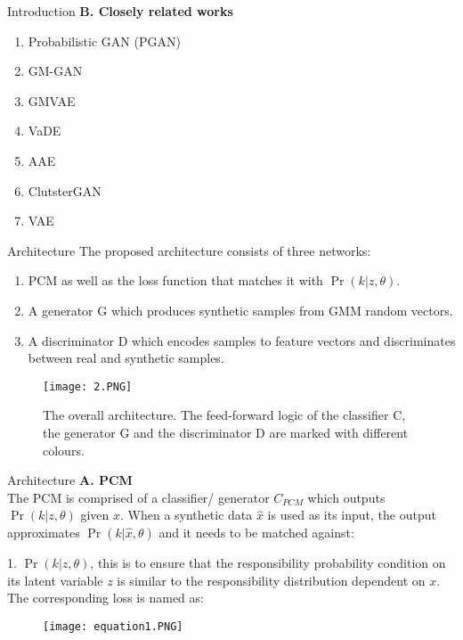 \documentclass{beamer}
\providecommand{\pr}[1]{\ensuremath{\Pr\left(#1\right)}}
\begin{document}
\begin{frame}{Introduction}
\textbf{B. Closely related works}
\begin{enumerate}
\item Probabilistic GAN (PGAN) 
\item GM-GAN
\item GMVAE
\item VaDE
\item AAE
\item ClutsterGAN
\item VAE
\end{enumerate}
\end{frame}


\begin{frame}{Architecture}
The proposed architecture consists of three networks:
\begin{enumerate}
\item PCM as well as the loss function that matches it with $\pr{k|z,\theta}$.
\item A generator G which produces synthetic samples from GMM random vectors.
\item A discriminator D which encodes samples to feature vectors and discriminates between real and synthetic samples. 
\end{enumerate}
\begin{figure}[!tbp]
  \centering
  {\texttt{[image: 2.PNG]}\label{fig:2}}
  \hfill
  
  \caption{ The overall architecture. The feed-forward logic of the classifier C, the generator G and the discriminator D are marked with different colours.}
\end{figure}

\end{frame}


\begin{frame}{Architecture}
\textbf{A. PCM}\\
The PCM is comprised of a classifier/ generator $C_{PCM}$ which outputs $\pr{k|z,\theta}$ given $x$. When a synthetic data $\hat{x}$ is used as its input, the output approximates $\pr{k|\hat{x},\theta}$ 
and it needs to be matched against:

1. $\pr{k|z,\theta}$, this is to ensure that the responsibility
probability condition on its latent variable $z$ is similar to the responsibility distribution dependent on $x$. The corresponding loss is named as:
\begin{figure}[!tbp]
  \centering
  {\texttt{[image: equation1.PNG]}}
  \hfill
\end{figure}
\end{frame}
\end{document}
